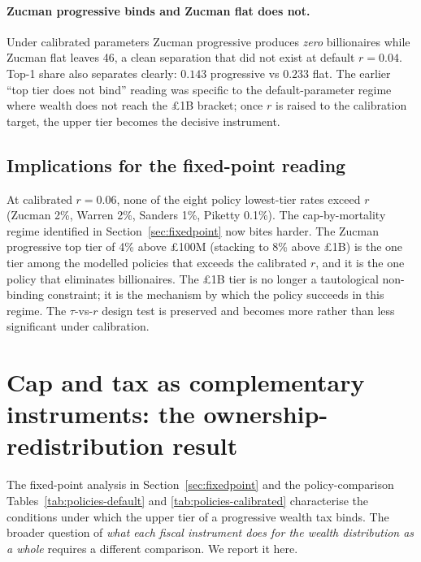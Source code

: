 \documentclass[11pt]{article}
\begin{document}
\paragraph{Zucman progressive binds and Zucman flat does not.}
Under calibrated parameters Zucman progressive produces \emph{zero}
billionaires while Zucman flat leaves 46, a clean separation that
did not exist at default $r = 0.04$.  Top-1 share also separates
clearly: $0.143$ progressive vs $0.233$ flat.  The earlier ``top
tier does not bind'' reading was specific to the default-parameter
regime where wealth does not reach the \pounds 1B bracket; once
$r$ is raised to the calibration target, the upper tier becomes the
decisive instrument.

\subsection{Implications for the fixed-point reading}

At calibrated $r = 0.06$, none of the eight policy lowest-tier rates
exceed $r$ (Zucman 2\%, Warren 2\%, Sanders 1\%, Piketty 0.1\%).
The cap-by-mortality regime identified in
Section~\ref{sec:fixedpoint} now bites harder.  The Zucman
progressive top tier of 4\% above \pounds 100M (stacking to 8\%
above \pounds 1B) is the one tier among the modelled policies that
exceeds the calibrated $r$, and it is the one policy that eliminates
billionaires.  The \pounds 1B tier is no longer a tautological
non-binding constraint; it is the mechanism by which the policy
succeeds in this regime.  The $\tau$-vs-$r$ design test is
preserved and becomes more rather than less significant under
calibration.

\section{Cap and tax as complementary instruments: the ownership-
redistribution result}
\label{sec:ownership}

The fixed-point analysis in Section~\ref{sec:fixedpoint} and the
policy-comparison Tables~\ref{tab:policies-default} and
\ref{tab:policies-calibrated} characterise the conditions under
which the upper tier of a progressive wealth tax binds.  The
broader question of \emph{what each fiscal instrument does for
the wealth distribution as a whole} requires a different
comparison.  We report it here.
\end{document}
